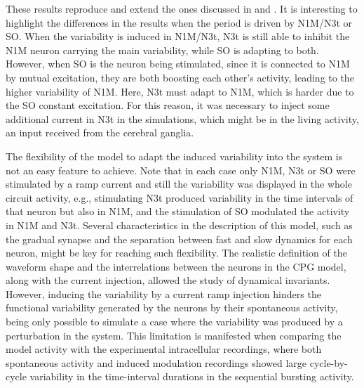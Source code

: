 These results reproduce and extend the ones discussed in \textcite{vavoulis_dynamic_2007} and \textcite{elliott_temporal_1991}. It is interesting to highlight the differences in the results when the period is driven by N1M/N3t or SO. When the variability is induced in N1M/N3t, N3t is still able to inhibit the N1M neuron carrying the main variability, while SO is adapting to both. However, when SO is the neuron being stimulated, since it is connected to N1M by mutual excitation, they are both boosting each other's activity, leading to the higher variability of N1M. Here, N3t must adapt to N1M, which is harder due to the SO constant excitation. For this reason, it was necessary to inject some additional current in N3t in the simulations, which might be in the living activity, an input received from the cerebral ganglia. 

The flexibility of the model to adapt the induced variability into the system is not an easy feature to achieve. Note that in each case only N1M, N3t or SO were stimulated by a ramp current and still the variability was displayed in the whole circuit activity, e.g., stimulating N3t produced variability in the time intervals of that neuron but also in N1M, and the stimulation of SO modulated the activity in N1M and N3t. Several characteristics in the description of this model, such as the gradual synapse and the separation between fast and slow dynamics for each neuron, might be key for reaching such flexibility. The realistic definition of the waveform shape and the interrelations between the neurons in the CPG model, along with the current injection, allowed the study of dynamical invariants. However, inducing the variability by a current ramp injection hinders the functional variability generated by the neurons by their spontaneous activity, being only possible to simulate a case where the variability was produced by a perturbation in the system. This limitation is manifested when comparing the model activity with the experimental intracellular recordings, where both spontaneous activity and induced modulation recordings showed large cycle-by-cycle variability in the time-interval durations in the sequential bursting activity. 

